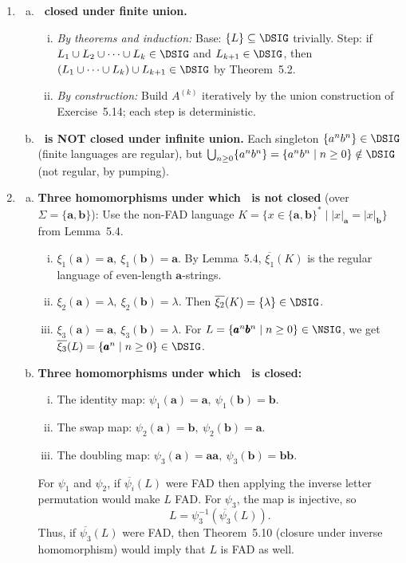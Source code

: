 \begin{enumerate}[{5.}1. ]
\item \begin{enumerate}[(a)]
  \item \textbf{\DSIG\ closed under finite union.}
  \begin{enumerate}[(i)]
    \item \emph{By theorems and induction:}  Base: $\{L\}\subseteq\DSIG$ trivially.  Step: if $L_1\cup L_2\cup\cdots\cup L_k\in\DSIG$ and $L_{k+1}\in\DSIG$, then $(L_1\cup\cdots\cup L_k)\cup L_{k+1}\in\DSIG$ by Theorem~5.2.
    \item \emph{By construction:}  Build $A^{(k)}$ iteratively by the union construction of Exercise~5.14; each step is deterministic.
  \end{enumerate}
  \item \textbf{\DSIG\ is NOT closed under infinite union.}  Each singleton $\{a^nb^n\}\in\DSIG$ (finite languages are regular), but $\bigcup_{n\ge 0}\{a^nb^n\}=\{a^nb^n\mid n\ge 0\}\notin\DSIG$ (not regular, by pumping).
\end{enumerate}

\item \begin{enumerate}[(a)]
  \item \textbf{Three homomorphisms under which \NSIG\ is not closed} (over $\Sigma=\{\pmb{a},\pmb{b}\}$):
  Use the non-FAD language
  $K=\{x\in\{\pmb{a},\pmb{b}\}^*\mid |x|_{\pmb{a}}=|x|_{\pmb{b}}\}$ from
  Lemma~5.4.
  \begin{enumerate}[(i)]
    \item $\xi_1(\pmb{a})=\pmb{a},\ \xi_1(\pmb{b})=\pmb{a}$.  By Lemma~5.4,
    $\overline{\xi_1}(K)$ is the regular language of even-length $\pmb{a}$-strings.
    \item $\xi_2(\pmb{a})=\lambda,\ \xi_2(\pmb{b})=\lambda$.  Then
    $\overline{\xi_2}(K)=\{\lambda\}\in\DSIG$.
    \item $\xi_3(\pmb{a})=\pmb{a},\ \xi_3(\pmb{b})=\lambda$.  For
    $L=\{\pmb{a}^n\pmb{b}^n\mid n\ge 0\}\in\NSIG$, we get
    $\overline{\xi_3}(L)=\{\pmb{a}^n\mid n\ge 0\}\in\DSIG$.
  \end{enumerate}

  \item \textbf{Three homomorphisms under which \NSIG\ is closed:}
  \begin{enumerate}[(i)]
    \item The identity map: $\psi_1(\pmb{a})=\pmb{a},\ \psi_1(\pmb{b})=\pmb{b}$.
    \item The swap map: $\psi_2(\pmb{a})=\pmb{b},\ \psi_2(\pmb{b})=\pmb{a}$.
    \item The doubling map: $\psi_3(\pmb{a})=\pmb{aa},\ \psi_3(\pmb{b})=\pmb{bb}$.
  \end{enumerate}
\noindent
For $\psi_1$ and $\psi_2$, if $\overline{\psi_i}(L)$ were FAD then applying the
inverse letter permutation would make $L$ FAD.  For $\psi_3$, the map is
injective, so
\[
L=\psi_3^{-1}(\overline{\psi_3}(L)).
\]
Thus, if $\overline{\psi_3}(L)$ were FAD, then Theorem~5.10 (closure under
inverse homomorphism) would imply that $L$ is FAD as well.
\end{enumerate}


\end{enumerate}
